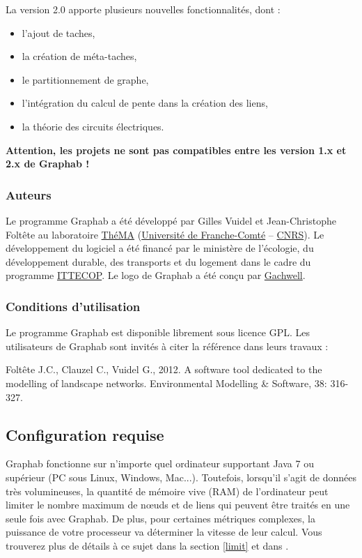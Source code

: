 \documentclass{article}
\begin{document}
La version 2.0 apporte plusieurs nouvelles fonctionnalités, dont :
\begin{itemize}
	\item l'ajout de taches,
	\item la création de méta-taches,
	\item le partitionnement de graphe,
	\item l'intégration du calcul de pente dans la création des liens,
	\item la théorie des circuits électriques.
\end{itemize}

\textbf{Attention, les projets ne sont pas compatibles entre les version 1.x et 2.x de Graphab !}

\subsubsection{Auteurs}
Le programme Graphab a été développé par Gilles Vuidel et Jean-Christophe Foltête au laboratoire \href{http://thema.univ-fcomte.fr}{ThéMA} (\href{http://www.univ-fcomte.fr}{Université de Franche-Comté} – \href{http://www.cnrs.fr}{CNRS}). Le développement du logiciel a été financé par le ministère de l'écologie, du développement durable, des transports et du logement dans le cadre du programme \href{http://www.ittecop.fr/}{ITTECOP}. Le logo de Graphab a été conçu par \href{http://www.gachwell.com/}{Gachwell}. 

\subsubsection{Conditions d’utilisation}
Le programme Graphab est disponible librement sous licence GPL. Les utilisateurs de Graphab sont invités à citer la référence \cite{2012_graphab_EMS} dans leurs travaux :

Foltête J.C., Clauzel C., Vuidel G., 2012. A software tool dedicated to the modelling of landscape networks. Environmental Modelling \& Software, 38: 316-327.


\subsection{Configuration requise}

Graphab fonctionne sur n'importe quel ordinateur supportant Java 7 ou supérieur (PC sous Linux, Windows, Mac...). Toutefois, lorsqu'il s'agit de données très volumineuses, la quantité de mémoire vive (RAM) de l’ordinateur peut limiter le nombre maximum de nœuds et de liens qui peuvent être traités en une seule fois avec Graphab. De plus, pour certaines métriques complexes, la puissance de votre processeur va déterminer la vitesse de leur calcul. Vous trouverez plus de détails à ce sujet dans la section \ref{limit} et dans \cite{2012_graphab_EMS}.
\end{document}

